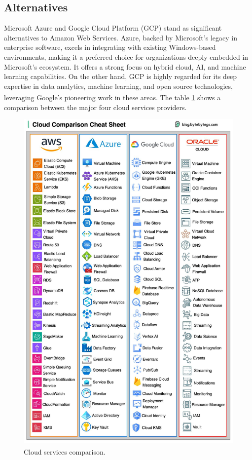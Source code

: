 \subsection{Alternatives}
Microsoft Azure and Google Cloud Platform (GCP) stand as significant alternatives to Amazon Web
Services. Azure, backed by Microsoft's legacy in enterprise software, excels in integrating with
existing Windows-based environments, making it a preferred choice for organizations deeply embedded
in Microsoft's ecosystem. It offers a strong focus on hybrid cloud, AI, and machine learning
capabilities. On the other hand, GCP is highly regarded for its deep expertise in data analytics,
machine learning, and open source technologies, leveraging Google's pioneering work in these
areas\textsuperscript{\cite{cloud_azure}}\textsuperscript{\cite{cloud_google}}. The table
\ref{fig:3_cloud_comparision} shows a comparison between the major four cloud services providers.

\begin{figure}
    \centering
    \includegraphics[scale=0.18]{Pictures/3_cloud_comparision.jpg}
    \caption{Cloud services comparison\textsuperscript{\cite{tech_8}}.}
    \label{fig:3_cloud_comparision}
\end{figure}

